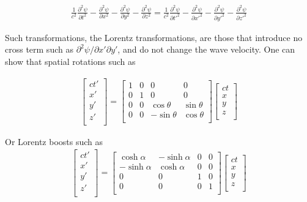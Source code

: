 \documentclass[]{eliblog}
\newcommand{\inv}[1]{\frac{1}{#1}}
\begin{document}
\begin{align}\label{eqn:waveEquationInv}
\inv{c^2} \frac{\partial^2 \psi}{\partial {t}^2} 
- \frac{\partial^2 \psi}{\partial {x}^2} 
- \frac{\partial^2 \psi}{\partial {y}^2} 
- \frac{\partial^2 \psi}{\partial {z}^2} 
=
\inv{c^2} \frac{\partial^2 \psi}{\partial {t'}^2} 
- \frac{\partial^2 \psi}{\partial {x'}^2} 
- \frac{\partial^2 \psi}{\partial {y'}^2} 
- \frac{\partial^2 \psi}{\partial {z'}^2} 
\end{align}

Such transformations, the Lorentz transformations,
are those that introduce no cross term such as $\partial^2 \psi/\partial x' \partial y'$,
and do not change the wave velocity.  One can show that spatial rotations such as

\begin{align}
\begin{bmatrix}
ct' \\
x' \\
y' \\
z' \\
\end{bmatrix}
=
\begin{bmatrix}
1 & 0 & 0 & 0 \\
0 & 1 & 0 & 0 \\
0 & 0 & \cos\theta & \sin\theta \\
0 & 0 & -\sin\theta & \cos\theta \\
\end{bmatrix}
\begin{bmatrix}
ct \\
x \\
y \\
z \\
\end{bmatrix}
\end{align}

Or Lorentz boosts such as
\begin{align}
\begin{bmatrix}
ct' \\
x' \\
y' \\
z' \\
\end{bmatrix}
=
\begin{bmatrix}
\cosh\alpha & -\sinh\alpha & 0 & 0 \\
-\sinh\alpha & \cosh\alpha & 0 & 0 \\
0 & 0 & 1 & 0 \\
0 & 0 & 0 & 1 \\
\end{bmatrix}
\begin{bmatrix}
ct \\
x \\
y \\
z \\
\end{bmatrix}
\end{align}
\end{document}
